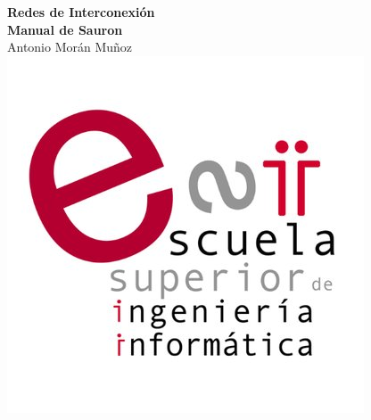\begin{titlepage}
\begin{flushright}
\LARGE{\textbf{Redes de Interconexión}}\\
\vfill
\Huge{\textbf{Manual de Sauron}}\\
    \vfill
    \large Antonio Morán Muñoz\\
\vfill
\includegraphics[width=0.3\linewidth]{figs/esiiab-logo.jpg}\\ 
 
\end{flushright}
\end{titlepage}


